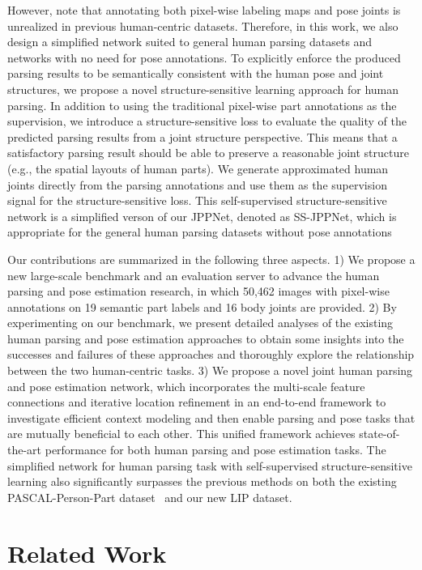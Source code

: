\documentclass[10pt,journal,compsoc]{IEEEtran}
\begin{document}
However, note that annotating both pixel-wise labeling maps and pose joints is unrealized in previous human-centric datasets. Therefore, in this work, we also design a simplified network suited to general human parsing datasets and networks with no need for pose annotations. To explicitly enforce the produced parsing results to be semantically consistent with the human pose and joint structures, we propose a novel structure-sensitive learning approach for human parsing. In addition to using the traditional pixel-wise part annotations as the supervision, we introduce a structure-sensitive loss to evaluate the quality of the predicted parsing results from a joint structure perspective. This means that a satisfactory parsing result should be able to preserve a reasonable joint structure (e.g., the spatial layouts of human parts). We generate approximated human joints directly from the parsing annotations and use them as the supervision signal for the structure-sensitive loss. This self-supervised structure-sensitive network is a simplified verson of our JPPNet, denoted as SS-JPPNet, which is appropriate for the general human parsing datasets without pose annotations

Our contributions are summarized in the following three aspects. 1) We propose a new large-scale benchmark and an evaluation server to advance the human parsing and pose estimation research, in which 50,462 images with pixel-wise annotations on 19 semantic part labels and 16 body joints are provided. 2) By experimenting on our benchmark, we present detailed analyses of the existing human parsing and pose estimation approaches to obtain some insights into the successes and failures of these approaches and thoroughly explore the relationship between the two human-centric tasks. 3) We propose a novel joint human parsing and pose estimation network, which incorporates the multi-scale feature connections and iterative location refinement in an end-to-end framework to investigate efficient context modeling and then enable parsing and pose tasks that are mutually beneficial to each other. This unified framework achieves state-of-the-art performance for both human parsing and pose estimation tasks. The simplified network for human parsing task with self-supervised structure-sensitive learning also significantly surpasses the previous methods on both the existing PASCAL-Person-Part dataset~\cite{chen2014detect} and our new LIP dataset.





\section{Related Work}
\end{document}
